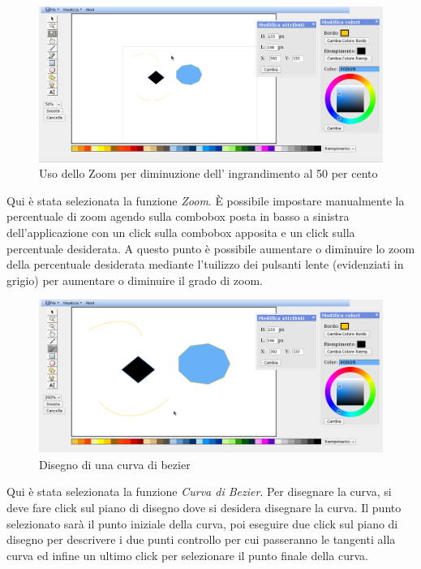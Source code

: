 \begin{figure}[!ht]
\centering
\includegraphics[scale=0.4]{images/zoom_meno.png}
\caption{Uso dello Zoom per diminuzione dell' ingrandimento al 50 per cento}
\end{figure} 

\vspace{100pt}
Qui \`e stata selezionata la funzione \textit{Zoom}. \`E possibile impostare manualmente la percentuale di zoom agendo sulla combobox posta in basso a sinistra dell'applicazione con un click sulla combobox apposita e un click sulla percentuale desiderata. A questo punto \`e possibile aumentare o diminuire lo zoom della percentuale desiderata mediante l'tuilizzo dei pulsanti lente (evidenziati in grigio) per aumentare o diminuire il grado di zoom.

\begin{figure}[!ht]
\centering
\includegraphics[scale=0.4]{images/bezier.png}
\caption{Disegno di una curva di bezier}
\end{figure} 

\vspace{100pt}
Qui \`e stata selezionata la funzione \textit{Curva di Bezier}. Per disegnare la curva, si deve fare click sul piano di disegno dove si desidera disegnare la curva. Il punto selezionato sar\`a il punto iniziale della curva, poi eseguire due click sul piano di disegno per descrivere i due punti controllo per cui passeranno le tangenti alla curva ed infine un ultimo click per selezionare il punto finale della curva.
\newpage

